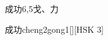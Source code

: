 \begin{entry}{成功}{6,5}{⼽、⼒}
  \begin{phonetics}{成功}{cheng2gong1}[][HSK 3]
  \end{phonetics}
\end{entry}
